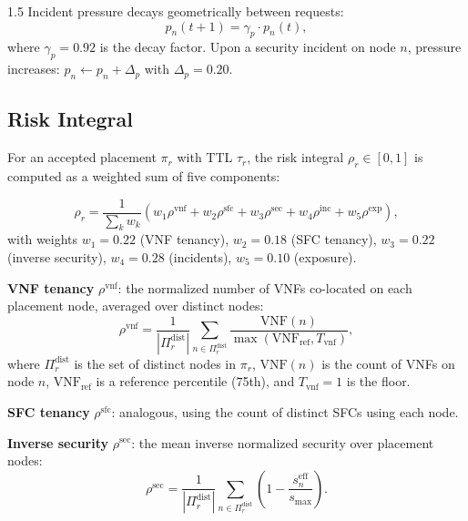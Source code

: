 \documentclass[A4paper,12pt]{report}
\theoremstyle{plain}
\theoremstyle{definition}
\theoremstyle{remark}
\numberwithin{equation}{section}
\begin{document}
\begin{spacing}{1.5}
Incident pressure decays geometrically between requests:
\begin{equation}
p_n(t+1) = \gamma_p \cdot p_n(t),
\end{equation}
where $\gamma_p = 0.92$ is the decay factor. Upon a security incident on node $n$, pressure increases: $p_n \leftarrow p_n + \Delta_p$ with $\Delta_p = 0.20$.

\subsection{Risk Integral}

For an accepted placement $\pi_r$ with TTL $\tau_r$, the risk integral $\rho_r \in [0,1]$ is computed as a weighted sum of five components:

\begin{equation}
\rho_r = \frac{1}{\sum_k w_k} \left( w_1 \rho^{\text{vnf}} + w_2 \rho^{\text{sfc}} + w_3 \rho^{\text{sec}} + w_4 \rho^{\text{inc}} + w_5 \rho^{\text{exp}} \right),
\label{eq:risk}
\end{equation}
with weights $w_1 = 0.22$ (VNF tenancy), $w_2 = 0.18$ (SFC tenancy), $w_3 = 0.22$ (inverse security), $w_4 = 0.28$ (incidents), $w_5 = 0.10$ (exposure).

\textbf{VNF tenancy} $\rho^{\text{vnf}}$: the normalized number of VNFs co-located on each placement node, averaged over distinct nodes:
\begin{equation}
\rho^{\text{vnf}} = \frac{1}{|\Pi_r^{\text{dist}}|} \sum_{n \in \Pi_r^{\text{dist}}} \frac{\text{VNF}(n)}{\max\!\left(\text{VNF}_{\text{ref}}, T_{\text{vnf}}\right)},
\end{equation}
where $\Pi_r^{\text{dist}}$ is the set of distinct nodes in $\pi_r$, $\text{VNF}(n)$ is the count of VNFs on node $n$, $\text{VNF}_{\text{ref}}$ is a reference percentile (75th), and $T_{\text{vnf}} = 1$ is the floor.

\textbf{SFC tenancy} $\rho^{\text{sfc}}$: analogous, using the count of distinct SFCs using each node.

\textbf{Inverse security} $\rho^{\text{sec}}$: the mean inverse normalized security over placement nodes:
\begin{equation}
\rho^{\text{sec}} = \frac{1}{|\Pi_r^{\text{dist}}|} \sum_{n \in \Pi_r^{\text{dist}}} \left(1 - \frac{s_n^{\text{eff}}}{s_{\max}}\right).
\end{equation}


\end{spacing}
\end{document}
